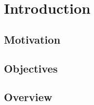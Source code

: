 
\chapter{Introduction}
\label{cha:introduction}

\section{Motivation}
\label{sec:motivation}


\section{Objectives}
\label{sec:objectives}


\section{Overview}
\label{sec:overview}